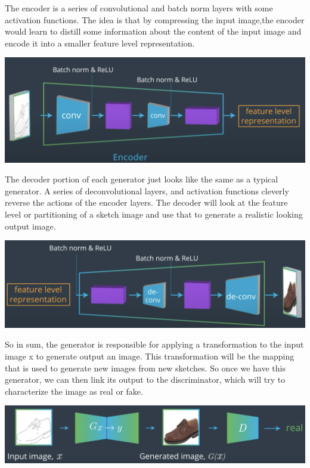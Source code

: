 The encoder is a series of convolutional and batch norm layers with some activation functions. The idea is that by compressing the input image,the encoder would learn to distill some information about the content of the input image and encode it into a smaller feature level representation.

\includegraphics[width=1\linewidth]{img//genAdvNet//image2image/pix2pixGenEncoder.png}

The decoder portion of each generator just looks like the same as a typical generator. A series of deconvolutional layers, and activation functions  cleverly reverse the actions of the encoder layers. The decoder will look at the feature level or partitioning of a sketch image and use that to generate a realistic looking output image.

\includegraphics[width=1\linewidth]{img//genAdvNet//image2image/pix2pixGenDecoder.png}

So in sum, the generator is responsible for applying a transformation to the input image x to generate output an image. This transformation will be the mapping that is used to generate new images from new sketches. So once we have this generator, we can then link its output to the discriminator, which will try to characterize the image as real or fake.

\includegraphics[width=1\linewidth]{img//genAdvNet//image2image/pix2pixGAN.png}

